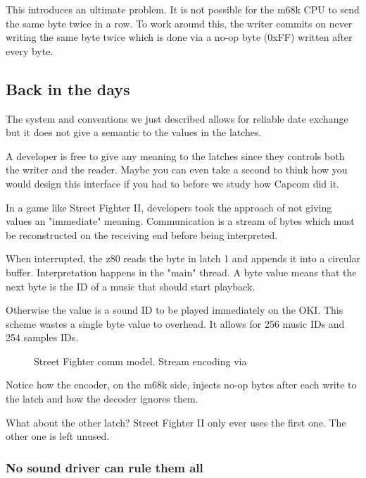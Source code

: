 This introduces an ultimate problem. It is not possible for the m68k CPU to send the same byte twice in a row. To work around this, the writer commits on never writing the same byte twice which is done via a no-op byte (0xFF) written after every byte.




\subsection{Back in the days}
The system and conventions we just described allows for reliable date exchange but it does not give a semantic to the values in the latches. 

A developer is free to give any meaning to the latches since they controls both the writer and the reader. Maybe you can even take a second to think how you would design this interface if you had to before we study how Capcom did it.

In a game like Street Fighter II, developers took the approach of not giving values an "immediate" meaning. Communication is a stream of bytes which must be reconstructed on the receiving end before being interpreted.



When interrupted, the z80 reads the byte in latch 1 and appends it into a circular buffer. Interpretation happens in the "main" thread. A byte value  means that the next byte is the ID of a music that should start playback. 

Otherwise the value is a sound ID to be played immediately on the OKI. This scheme wastes a single byte value to overhead. It allows for 256 music IDs and 254 samples IDs.

 \begin{figure}[H]
\caption*{Street Fighter comm model. Stream encoding via }
\end{figure}

Notice how the encoder, on the m68k side, injects  no-op bytes after each write to the latch and how the decoder ignores them.

What about the other latch? Street Fighter II only ever uses the first one. The other one is left unused.

\subsubsection{No sound driver can rule them all}

